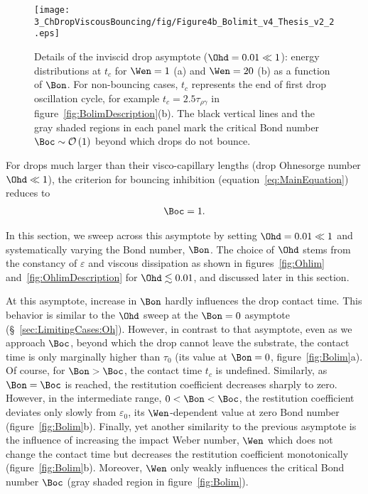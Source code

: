 \begin{figure}
	\centering
	\texttt{[image: 3\_ChDropViscousBouncing/fig/Figure4b\_Bolimit\_v4\_Thesis\_v2\_2.eps]}
	\caption{Details of the inviscid drop asymptote ($\Ohd = 0.01 \ll 1$): energy distributions at $t_c$ for $\Wen = 1$ (a) and $\Wen = 20$ (b) as a function of $\Bon$. For non-bouncing cases, $t_c$ represents the end of first drop oscillation cycle, for example $t_c = 2.5\tau_{\rho\gamma}$ in figure~\ref{fig:BolimDescription}(b). The black vertical lines and the gray shaded regions in each panel mark the critical Bond number $\Boc \sim \mathcal{O}\left(1\right)$ beyond which drops do not bounce.}
	\label{fig:BolimDescription2}
\end{figure}

For drops much larger than their visco-capillary lengths (drop Ohnesorge number $\Ohd \ll 1$), the criterion for bouncing inhibition (equation~\eqref{eq:MainEquation}) reduces to
\begin{align}
	\Boc = 1.
\end{align}

In this section, we sweep across this asymptote by setting $\Ohd = 0.01 \ll 1$ and systematically varying the Bond number, $\Bon$. The choice of $\Ohd$ stems from the constancy of $\varepsilon$ and viscous dissipation as shown in figures~\ref{fig:Ohlim} and~\ref{fig:OhlimDescription} for $\Ohd \lesssim 0.01$, and discussed later in this section.

At this asymptote, increase in $\Bon$ hardly influences the drop contact time. This behavior is similar to the $\Ohd$ sweep at the $\Bon = 0$ asymptote (\S~\ref{sec:LimitingCases:Oh}). However, in contrast to that asymptote, even as we approach $\Boc$, beyond which the drop cannot leave the substrate, the contact time is only marginally higher than $\tau_0$ (its value at $\Bon = 0$, figure~\ref{fig:Bolim}a). 
Of course, for $\Bon > \Boc$, the contact time $t_c$ is undefined. Similarly, as $\Bon = \Boc$ is reached, the restitution coefficient decreases sharply to zero. However, in the intermediate range, $0 < \Bon < \Boc$, the restitution coefficient deviates only slowly from $\varepsilon_0$, its $\Wen$-dependent value at zero Bond number (figure~\ref{fig:Bolim}b). 
Finally, yet another similarity to the previous asymptote is the influence of increasing the impact Weber number, $\Wen$ which does not change the contact time but decreases the restitution coefficient monotonically (figure~\ref{fig:Bolim}b). Moreover, $\Wen$ only weakly influences the critical Bond number $\Boc$ (gray shaded region in figure~\ref{fig:Bolim}).

